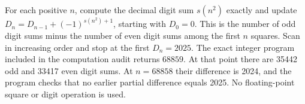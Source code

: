 For each positive $n$, compute the decimal digit sum $s(n^2)$ exactly and update $D_n=D_{n-1}+(-1)^{s(n^2)+1}$, starting with $D_0=0$. This is the number of odd digit sums minus the number of even digit sums among the first $n$ squares. Scan in increasing order and stop at the first $D_n=2025$. The exact integer program included in the computation audit returns $\boxed{68859}$. At that point there are 35442 odd and 33417 even digit sums. At $n=68858$ their difference is 2024, and the program checks that no earlier partial difference equals 2025. No floating-point square or digit operation is used.
